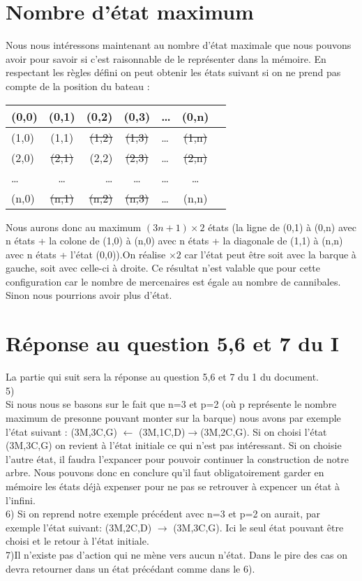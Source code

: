\documentclass[a4paper, 12pt, french,oneside]{book}
\begin{document}
\section{Nombre d'état maximum}
Nous nous intéressons maintenant au nombre d'état maximale que nous pouvons avoir pour savoir si c'est raisonnable de le représenter dans la mémoire. En respectant les règles défini on peut obtenir les états suivant si on ne prend pas compte de la position du bateau :
\begin{tabular}{|l|c|r|c|l|c|r|}
    \hline
    (0,0)        & (0,1) & (0,2) & (0,3) & \dots & (0,n) \\
    \hline
    (1,0)        &
    (1,1)        &
    \sout{(1,2)} &
    \sout{(1,3)} & \dots &
    \sout{(1,n)}                                         \\
    \hline
    (2,0)        &
    \sout{(2,1)} &
    (2,2)        &
    \sout{(2,3)} & \dots &
    \sout{(2,n)}                                         \\
    \hline
    \dots        & \dots & \dots & \dots & \dots & \dots \\
    \hline
    (n,0)        &
    \sout{(n,1)} &
    \sout{(n,2)} &
    \sout{(n,3)} & \dots & (n,n)                         \\
    \hline
\end{tabular}
Nous aurons donc au maximum $(3n+1)\times2$ états (la ligne de (0,1) à (0,n) avec n états + la colone de (1,0) à (n,0) avec n états + la diagonale de (1,1) à (n,n) avec n états + l'état (0,0)).On réalise $\times 2$ car l'état peut être soit avec la barque à gauche, soit avec celle-ci à droite. Ce résultat n'est valable que pour cette configuration car le nombre de mercenaires est égale au nombre de cannibales. Sinon nous pourrions avoir plus d'état.
\section{Réponse au question 5,6 et 7 du I}
La partie qui suit sera la réponse au question 5,6 et 7 du 1 du document. \\
5) \\
Si nous nous se basons sur le fait que n=3 et p=2 (où p représente le nombre maximum de presonne pouvant monter sur la barque) nous avons par exemple l'état suivant :
(3M,3C,G) $\leftarrow$ (3M,1C,D)$\rightarrow$(3M,2C,G). Si on choisi l'état (3M,3C,G) on revient à l'état initiale ce qui n'est pas intéressant. Si on choisie l'autre état, il faudra l'expancer pour pouvoir continuer la construction de notre arbre. Nous pouvons donc en conclure qu'il faut obligatoirement garder en mémoire les états déjà expenser pour ne pas se retrouver à expencer un état à l'infini.\\
6) Si on reprend notre exemple précédent avec n=3 et p=2 on aurait, par exemple l'état suivant: (3M,2C,D) $\rightarrow$ (3M,3C,G). Ici le seul état pouvant être choisi et le retour à l'état initiale.\\
7)Il n'existe pas d'action qui ne mène vers aucun n'état. Dans le pire des cas on devra retourner dans un état précédant comme dans le 6). \\
\end{document}
